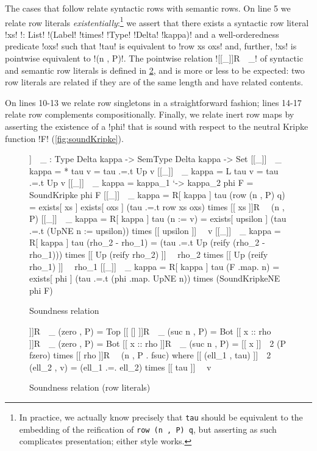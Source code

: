 \documentclass[sigplan,10pt,anonymous,review]{acmart}\settopmatter{printfolios=true,printccs=false,printacmref=false}
\begin{document}
The cases that follow relate syntactic rows with semantic rows. On line 5 we relate row literals \emph{existentially}:\footnote{In practice, we actually know precisely that \lstinline{tau} should be equivalent to the embedding of the reification of \lstinline{row (n , P) q}, but asserting as such complicates presentation; either style works.} we assert that there exists a syntactic row literal !xs! !: List! !(Label! !times! !Type! !Delta! !kappa)! and a well-orderedness predicate !oxs! such that !tau! is equivalent to !row xs oxs! and, further, !xs! is pointwise equivalent to !(n , P)!. The pointwise relation ![[_]]R~~_! of syntactic and semantic row literals is defined in \cref{fig:soundness-relation-row-literals}, and is more or less to be expected: two row literals are related if they are of the same length and have related contents. 

On lines 10-13 we relate row singletons in a straightforward fashion; lines 14-17 relate row complements compositionally. Finally, we relate inert row maps by asserting the existence of a !phi! that is sound with respect to the neutral Kripke function !F! (\cref{fig:soundKripke}).

\begin{figure}
\begin{agdaf}
[[_]]~~_ : Type Delta kappa -> SemType Delta kappa -> Set
[[_]]~~_ {kappa = *} tau  v = tau .=.t Up v
[[_]]~~_ {kappa = L} tau  v = tau .=.t Up v
[[_]]~~_ {kappa = kappa_1 `-> kappa_2} phi F = SoundKripke phi F
[[_]]~~_ {kappa = R[ kappa ]} tau (row (n , P) q) =
  exists[ xs ] 
  exists[ oxs ]
  (tau .=.t row xs oxs) times
  [[ xs ]]R~~ (n , P)
[[_]]~~_ {kappa = R[ kappa ]} tau (n := v) = 
  exists[ upsilon ]
  (tau .=.t (UpNE n := upsilon)) times
  [[ upsilon ]]~~ v
[[_]]~~_ {kappa = R[ kappa ]} tau (rho_2 - rho_1) = 
  (tau .=.t Up (reify (rho_2 - rho_1))) times 
  [[ Up (reify rho_2) ]]~~ rho_2 times 
  [[ Up (reify rho_1) ]]~~ rho_1
[[_]]~~_ {kappa = R[ kappa ]} tau (F .map. n) = 
  exists[ phi ]
  (tau .=.t (phi .map. UpNE n)) times
  (SoundKripkeNE phi F)
\end{agdaf}
\caption{Soundness relation}
\label{fig:soundness-relation}
\end{figure}
\begin{figure}
\begin{agda}
[[ [] ]]R~~_ (zero , P) = Top
[[ [] ]]R~~_ (suc n , P) = Bot
[[ x :: rho ]]R~~_ (zero , P) = Bot
[[ x :: rho ]]R~~_ (suc n , P) = 
  [[ x ]]~~2 (P fzero) times 
  [[ rho ]]R~~ (n , P . fsuc)
  where
    [[ (ell_1 , tau) ]]~~2 (ell_2 , v) = 
      (ell_1 .=. ell_2) times [[ tau ]]~~ v 
\end{agda}
\caption{Soundness relation (row literals)}
\label{fig:soundness-relation-row-literals}
\end{figure}
\end{document}
